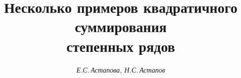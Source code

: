 









\newcommand{\tg}{\operatorname{tg}}


\newcommand{\arctg}{\operatorname{arctg}}


\newcommand{\tts}[1]{}







\setcounter{page}{23}















\author{\it Е.С.\,Астапова, Н.С.\,Астапов}




\title{Несколько примеров квадратичного суммирования \\ степенных рядов}





\date{}




\pagestyle{plain} %







\maketitle


